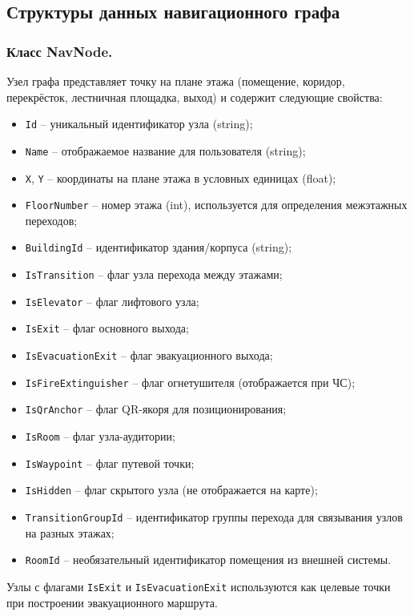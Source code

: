 \subsection{Структуры данных навигационного графа}

\subsubsection{Класс NavNode.} 

Узел графа представляет точку на плане этажа (помещение, коридор, перекрёсток, лестничная площадка, выход) и содержит следующие свойства:
\begin{itemize}
\item \texttt{Id} -- уникальный идентификатор узла (string);
\item \texttt{Name} -- отображаемое название для пользователя (string);
\item \texttt{X}, \texttt{Y} -- координаты на плане этажа в условных единицах (float);
\item \texttt{FloorNumber} -- номер этажа (int), используется для определения межэтажных переходов;
\item \texttt{BuildingId} -- идентификатор здания/корпуса (string);
\item \texttt{IsTransition} -- флаг узла перехода между этажами;
\item \texttt{IsElevator} -- флаг лифтового узла;
\item \texttt{IsExit} -- флаг основного выхода;
\item \texttt{IsEvacuationExit} -- флаг эвакуационного выхода;
\item \texttt{IsFireExtinguisher} -- флаг огнетушителя (отображается при ЧС);
\item \texttt{IsQrAnchor} -- флаг QR-якоря для позиционирования;
\item \texttt{IsRoom} -- флаг узла-аудитории;
\item \texttt{IsWaypoint} -- флаг путевой точки;
\item \texttt{IsHidden} -- флаг скрытого узла (не отображается на карте);
\item \texttt{TransitionGroupId} -- идентификатор группы перехода для связывания узлов на разных этажах;
\item \texttt{RoomId} -- необязательный идентификатор помещения из внешней системы.
\end{itemize}

Узлы с флагами \texttt{IsExit} и \texttt{IsEvacuationExit} используются как целевые точки при построении эвакуационного маршрута.

